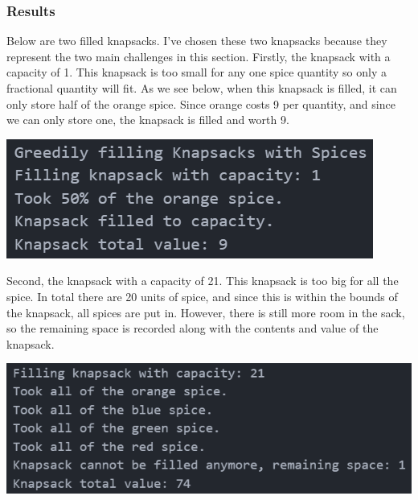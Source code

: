 \documentclass[12pt, letterpaper]{article}
\begin{document}
\subsubsection{Results}
Below are two filled knapsacks.
I've chosen these two knapsacks because they represent the two main challenges in this section.
Firstly, the knapsack with a capacity of 1.
This knapsack is too small for any one spice quantity so only a fractional quantity will fit.
As we see below, when this knapsack is filled, it can only store half of the orange spice.
Since orange costs 9 per quantity, and since we can only store one, the knapsack is filled and worth 9.
\begin{center}
   \includegraphics{results/SpiceKnapsack_Knapsack1_FracKnapsack.png}
\end{center}
Second, the knapsack with a capacity of 21.
This knapsack is too big for all the spice.
In total there are 20 units of spice, and since this is within the bounds of the knapsack, all spices are put in.
However, there is still more room in the sack, so the remaining space is recorded along with the contents and value of the knapsack.
\begin{center}
   \includegraphics{results/SpiceKnapsack_Knapsack21_FracKnapsack.png}
\end{center}
\end{document}
